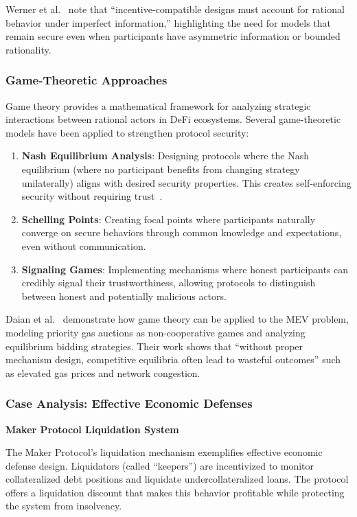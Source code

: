 \documentclass[conference]{IEEEtran}
\begin{document}
    Werner et al.~\cite{werner2021sok} note that ``incentive-compatible designs must account for rational behavior under imperfect information,'' highlighting the need for models that remain secure even when participants have asymmetric information or bounded rationality.

    \subsubsection{Game-Theoretic Approaches}
    Game theory provides a mathematical framework for analyzing strategic interactions between rational actors in DeFi ecosystems. Several game-theoretic models have been applied to strengthen protocol security:

    \begin{enumerate}
        \item \textbf{Nash Equilibrium Analysis}: Designing protocols where the Nash equilibrium (where no participant benefits from changing strategy unilaterally) aligns with desired security properties. This creates self-enforcing security without requiring trust~\cite{qin2022quantifying}.
        
        \item \textbf{Schelling Points}: Creating focal points where participants naturally converge on secure behaviors through common knowledge and expectations, even without communication.
        
        \item \textbf{Signaling Games}: Implementing mechanisms where honest participants can credibly signal their trustworthiness, allowing protocols to distinguish between honest and potentially malicious actors.
    \end{enumerate}

    Daian et al.~\cite{daian2020flash} demonstrate how game theory can be applied to the MEV problem, modeling priority gas auctions as non-cooperative games and analyzing equilibrium bidding strategies. Their work shows that ``without proper mechanism design, competitive equilibria often lead to wasteful outcomes'' such as elevated gas prices and network congestion.

    \subsubsection{Case Analysis: Effective Economic Defenses}
    \textbf{Maker Protocol Liquidation System}

    The Maker Protocol's liquidation mechanism exemplifies effective economic defense design. Liquidators (called ``keepers'') are incentivized to monitor collateralized debt positions and liquidate undercollateralized loans. The protocol offers a liquidation discount that makes this behavior profitable while protecting the system from insolvency.
\end{document}
